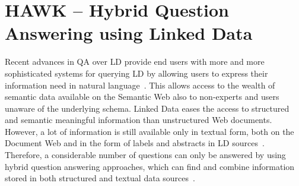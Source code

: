 \chapter{HAWK -- Hybrid Question Answering using Linked Data}
\label{cha:hawk}
Recent advances in \ac{QA} over \ac{LD} provide end users with more and more sophisticated systems for querying \ac{LD} by allowing users to express their information need in natural language~\cite{SINA_WebSemantic,pythia,template}. 
This allows access to the wealth of semantic data available on the Semantic Web also to non-experts and users unaware of the underlying schema. 
Linked Data eases the access to structured and semantic meaningful information than unstructured Web documents.
However, a lot of information is still available only in textual form, both on the Document Web and in the form of labels and abstracts in \ac{LD} sources~\cite{GER+13}.
Therefore, a considerable number of questions can only be answered by using hybrid question answering approaches, which  can find and combine information stored in both structured and textual data sources~\cite{combiningLDandIR}.

